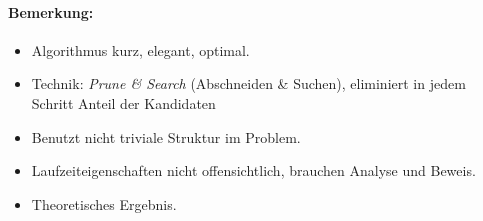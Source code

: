 \begin{description}
		\paragraph*{Bemerkung:}
		\begin{itemize}
		 \item Algorithmus kurz, elegant, optimal.
		 \item Technik: \emph{Prune \& Search} (Abschneiden \& Suchen), eliminiert in jedem Schritt Anteil der Kandidaten
		 \item Benutzt nicht triviale Struktur im Problem.
		 \item Laufzeiteigenschaften nicht offensichtlich, brauchen Analyse und Beweis.
		 \item Theoretisches Ergebnis.
		\end{itemize}

\end{description}

